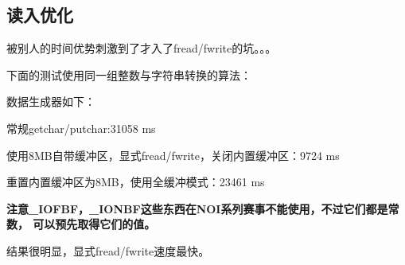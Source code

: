 \subsection{读入优化}
被别人的时间优势刺激到了才入了fread/fwrite的坑。。。

下面的测试使用同一组整数与字符串转换的算法：


数据生成器如下：


常规getchar/putchar:31058 ms


使用8MB自带缓冲区，显式fread/fwrite，关闭内置缓冲区：9724 ms


重置内置缓冲区为8MB，使用全缓冲模式：23461 ms


{\bfseries 注意\_IOFBF，\_IONBF这些东西在NOI系列赛事不能使用，不过它们都是常数，
可以预先取得它们的值。}

结果很明显，显式fread/fwrite速度最快。
